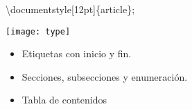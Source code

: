 \begin{frame}
    
    \textbackslash documentstyle[12pt]\{article\};
         
    \texttt{[image: type]}\\   
   
    \begin{itemize}    
        \item Etiquetas con inicio y fin.
        \item Secciones, subsecciones y enumeración.
        \item Tabla de contenidos        
    \end{itemize}         
    
\end{frame}

